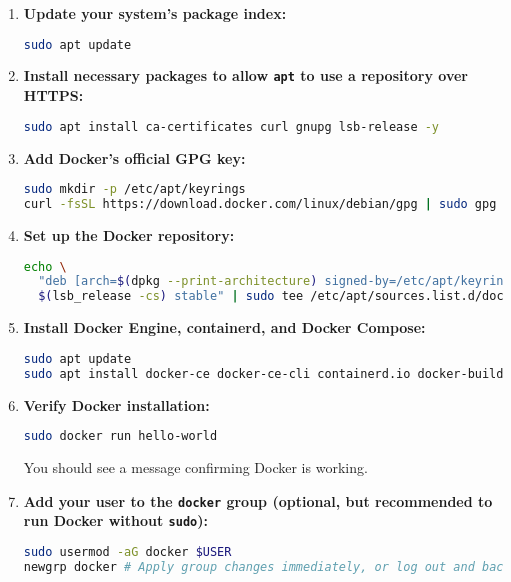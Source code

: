 \documentclass{article}
\begin{document}
\begin{enumerate}
    \item \textbf{Update your system's package index:}
    \begin{lstlisting}[language=bash, caption=Update apt package index]
sudo apt update
    \end{lstlisting}

    \item \textbf{Install necessary packages to allow \texttt{apt} to use a repository over HTTPS:}
    \begin{lstlisting}[language=bash, caption=Install HTTPS transport packages]
sudo apt install ca-certificates curl gnupg lsb-release -y
    \end{lstlisting}

    \item \textbf{Add Docker's official GPG key:}
    \begin{lstlisting}[language=bash, caption=Add Docker GPG key]
sudo mkdir -p /etc/apt/keyrings
curl -fsSL https://download.docker.com/linux/debian/gpg | sudo gpg --dearmor -o /etc/apt/keyrings/docker.gpg
    \end{lstlisting}

    \item \textbf{Set up the Docker repository:}
    \begin{lstlisting}[language=bash, caption=Configure Docker repository]
echo \
  "deb [arch=$(dpkg --print-architecture) signed-by=/etc/apt/keyrings/docker.gpg] https://download.docker.com/linux/debian \
  $(lsb_release -cs) stable" | sudo tee /etc/apt/sources.list.d/docker.list > /dev/null
    \end{lstlisting}

    \item \textbf{Install Docker Engine, containerd, and Docker Compose:}
    \begin{lstlisting}[language=bash, caption=Install Docker components]
sudo apt update
sudo apt install docker-ce docker-ce-cli containerd.io docker-buildx-plugin docker-compose-plugin -y
    \end{lstlisting}

    \item \textbf{Verify Docker installation:}
    \begin{lstlisting}[language=bash, caption=Verify Docker]
sudo docker run hello-world
    \end{lstlisting}
    You should see a message confirming Docker is working.

    \item \textbf{Add your user to the \texttt{docker} group (optional, but recommended to run Docker without \texttt{sudo}):}
    \begin{lstlisting}[language=bash, caption=Add user to docker group]
sudo usermod -aG docker $USER
newgrp docker # Apply group changes immediately, or log out and back in
    \end{lstlisting}
\end{enumerate}
\end{document}
